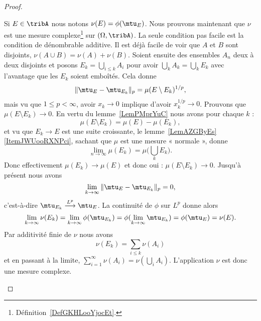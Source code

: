 \begin{proof}
\begin{subproof}
            Si \( E\in\tribA\) nous notons \( \nu(E)=\phi(\mtu_E)\). Nous prouvons maintenant que \( \nu\) est une mesure complexe\footnote{Définition~\ref{DefGKHLooYjocEt}.} sur \( (\Omega,\tribA)\). La seule condition pas facile est la condition de dénombrable additive. Il est déjà facile de voir que \( A\) et \( B\) sont disjoints, \( \nu(A\cup B)=\nu(A)+\nu(B)\). Soient ensuite des ensembles \( A_n\) deux à deux disjoints et posons \( E_k=\bigcup_{i\leq k}A_i\) pour avoir \( \bigcup_kA_k=\bigcup_kE_k\) avec l'avantage que les \( E_k\) soient emboîtés. Cela donne
            \begin{equation}
                \| \mtu_E-\mtu_{E_k} \|_p=\mu(E\setminus E_k)^{1/p},
            \end{equation}
            mais vu que \( 1\leq p<\infty\), avoir \( x_k\to 0\) implique d'avoir \( x_k^{1/p}\to 0\). Prouvons que \( \mu(E\setminus E_k)\to 0\). En vertu du lemme~\ref{LemPMprYuC} nous avons pour chaque \( k\) :
            \begin{equation}
                \mu(E\setminus E_k)=\mu(E)-\mu(E_k),
            \end{equation}
            et vu que \( E_k\to E\) est une suite croissante, le lemme~\ref{LemAZGByEs}\ref{ItemJWUooRXNPci}, sachant que \( \mu\) est une mesure « normale », donne
            \begin{equation}
                \lim_{n\to \infty} \mu(E_k)=\mu\big( \bigcup_kE_k \big).
            \end{equation}
            Donc effectivement \( \mu(E_k)\to \mu(E)\) et donc oui : \( \mu(E\setminus E_k)\to 0\). Jusqu'à présent nous avons
            \begin{equation}
                \lim_{k\to \infty} \| \mtu_E-\mtu_{E_k} \|_p=0,
            \end{equation}
            c'est-à-dire \( \mtu_{E_k}\stackrel{L^p}{\longrightarrow}\mtu_E\). La continuité de \( \phi\) sur \( L^p\) donne alors
            \begin{equation}
                \lim_{k\to \infty} \nu(E_k)=\lim_{k\to \infty} \phi(\mtu_{E_k})=\phi(\lim_{k\to \infty} \mtu_{E_k})=\phi(\mtu_E)=\nu(E).
            \end{equation}
            Par additivité finie de \( \nu\) nous avons
            \begin{equation}
                \nu(E_k)=\sum_{i\leq k}\nu(A_i)
            \end{equation}
            et en passant à la limite, \( \sum_{i=1}^{\infty}\nu(A_i)=\nu(\bigcup_{i}A_i)\). L'application \( \nu\) est donc une mesure complexe.


\end{subproof}
\end{proof}
